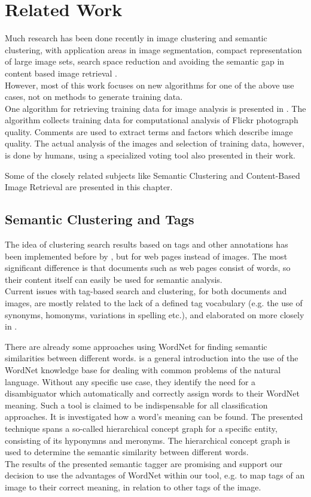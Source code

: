 \section{Related Work}
\label{sec_relatedwork}

Much research has been done recently in image clustering and semantic clustering, with application areas in image segmentation, compact representation of large image sets, search space reduction and avoiding the semantic gap in content based image retrieval \cite{Lim2011}. \\
However, most of this work focuses on new algorithms for one of the above use cases, not on methods to generate training data. \\

One algorithm for retrieving training data for image analysis is presented in \cite{Orendovici2010}. The algorithm collects training data for computational analysis of Flickr photograph quality. Comments are used to extract terms and factors which describe image quality. The actual analysis of the images and selection of training data, however, is done by humans, using a specialized voting tool also presented in their work.

\bigskip
Some of the closely related subjects like Semantic Clustering and Content-Based Image Retrieval are presented in this chapter.

\subsection{Semantic Clustering and Tags}
The idea of clustering search results based on tags and other annotations has been implemented before by \cite{Ramage2009}, but for web pages instead of images. The most significant difference is that documents such as web pages consist of words, so their content itself can easily be used for semantic analysis.\\
Current issues with tag-based search and clustering, for both documents and images, are mostly related to the lack of a defined tag vocabulary (e.g. the use of synonyms, homonyms, variations in spelling etc.), and elaborated on more closely in \cite{Auer2011}.

\bigskip
There are already some approaches using WordNet for finding semantic similarities between different words.  \cite{richardson1994using} is a general introduction into the use of the WordNet knowledge base for dealing with common problems of the natural language. Without any specific use case, they identify the need for a disambiguator which automatically and correctly assign words to their WordNet meaning. Such a tool is claimed to be indispensable for all classification approaches. It is investigated how a word's meaning can be found. The presented technique spans a so-called hierarchical concept graph for a specific entity, consisting of its hyponymns and meronyms. The hierarchical concept graph is used to determine the semantic similarity between different words. \\
The results of the presented semantic tagger are promising and support our decision to use the advantages of WordNet within our tool, e.g. to map tags of an image to their correct meaning, in relation to other tags of the image. 

